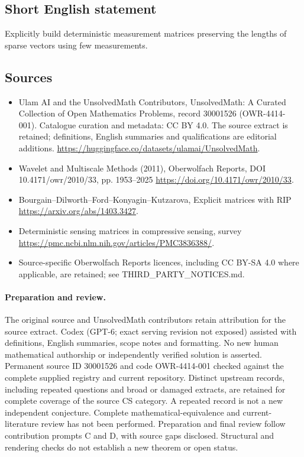 \documentclass[11pt]{article}
\begin{document}
\subsection{Short English statement}
Explicitly build deterministic measurement matrices preserving the lengths of sparse vectors using few measurements.
\subsection{Sources}
\begin{itemize}
\item[\hypertarget{source:30001526:1}{S1}] Ulam AI and the UnsolvedMath Contributors, UnsolvedMath: A Curated Collection of Open Mathematics Problems, record 30001526 (OWR-4414-001). Catalogue curation and metadata: CC BY 4.0. The source extract is retained; definitions, English summaries and qualifications are editorial additions.
\url{https://huggingface.co/datasets/ulamai/UnsolvedMath}.
\item[\hypertarget{source:30001526:2}{S2}] Wavelet and Multiscale Methods (2011), Oberwolfach Reports, DOI 10.4171/owr/2010/33, pp. 1953--2025
\url{https://doi.org/10.4171/owr/2010/33}.
\item[\hypertarget{source:30001526:3}{S3}] Bourgain--Dilworth--Ford--Konyagin--Kutzarova, Explicit matrices with RIP
\url{https://arxiv.org/abs/1403.3427}.
\item[\hypertarget{source:30001526:4}{S4}] Deterministic sensing matrices in compressive sensing, survey
\url{https://pmc.ncbi.nlm.nih.gov/articles/PMC3836388/}.
\item Source-specific Oberwolfach Reports licences, including CC BY-SA 4.0 where applicable, are retained; see THIRD\_PARTY\_NOTICES.md.
\end{itemize}
\paragraph{Preparation and review.}
The original source and UnsolvedMath contributors retain attribution for the source extract. Codex (GPT-6; exact serving revision not exposed) assisted with definitions, English summaries, scope notes and formatting. No new human mathematical authorship or independently verified solution is asserted. Permanent source ID 30001526 and code OWR-4414-001 checked against the complete supplied registry and current repository. Distinct upstream records, including repeated questions and broad or damaged extracts, are retained for complete coverage of the source CS category. A repeated record is not a new independent conjecture. Complete mathematical-equivalence and current-literature review has not been performed. Preparation and final review follow contribution prompts C and D, with source gaps disclosed. Structural and rendering checks do not establish a new theorem or open status.
\label{end:30001526}
\end{document}
